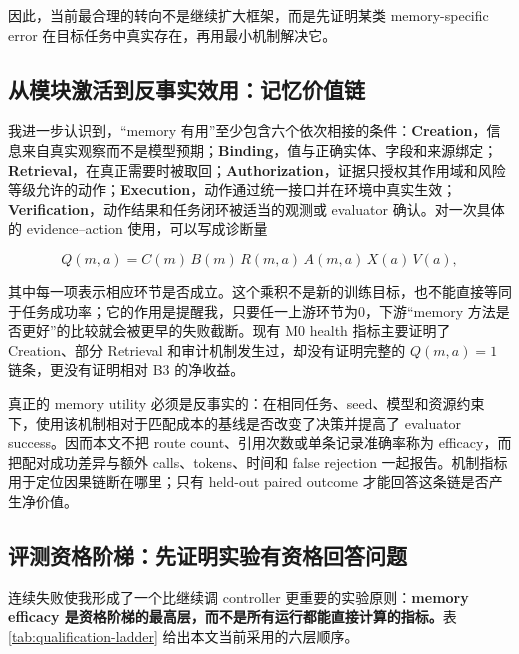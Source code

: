 \documentclass[12pt,a4paper]{ctexart}
\begin{document}
因此，当前最合理的转向不是继续扩大框架，而是先证明某类 memory-specific error 在目标任务中真实存在，再用最小机制解决它。

\subsection{从模块激活到反事实效用：记忆价值链}

我进一步认识到，“memory 有用”至少包含六个依次相接的条件：\textbf{Creation}，信息来自真实观察而不是模型预期；\textbf{Binding}，值与正确实体、字段和来源绑定；\textbf{Retrieval}，在真正需要时被取回；\textbf{Authorization}，证据只授权其作用域和风险等级允许的动作；\textbf{Execution}，动作通过统一接口并在环境中真实生效；\textbf{Verification}，动作结果和任务闭环被适当的观测或 evaluator 确认。对一次具体的 evidence--action 使用，可以写成诊断量

\begin{equation}
    Q(m,a)=C(m)\,B(m)\,R(m,a)\,A(m,a)\,X(a)\,V(a),
\end{equation}

其中每一项表示相应环节是否成立。这个乘积不是新的训练目标，也不能直接等同于任务成功率；它的作用是提醒我，只要任一上游环节为0，下游“memory 方法是否更好”的比较就会被更早的失败截断。现有 M0 health 指标主要证明了 Creation、部分 Retrieval 和审计机制发生过，却没有证明完整的 $Q(m,a)=1$ 链条，更没有证明相对 B3 的净收益。

真正的 memory utility 必须是反事实的：在相同任务、seed、模型和资源约束下，使用该机制相对于匹配成本的基线是否改变了决策并提高了 evaluator success。因而本文不把 route count、引用次数或单条记录准确率称为 efficacy，而把配对成功差异与额外 calls、tokens、时间和 false rejection 一起报告。机制指标用于定位因果链断在哪里；只有 held-out paired outcome 才能回答这条链是否产生净价值。

\subsection{评测资格阶梯：先证明实验有资格回答问题}

连续失败使我形成了一个比继续调 controller 更重要的实验原则：\textbf{memory efficacy 是资格阶梯的最高层，而不是所有运行都能直接计算的指标。}表\ref{tab:qualification-ladder} 给出本文当前采用的六层顺序。
\end{document}
